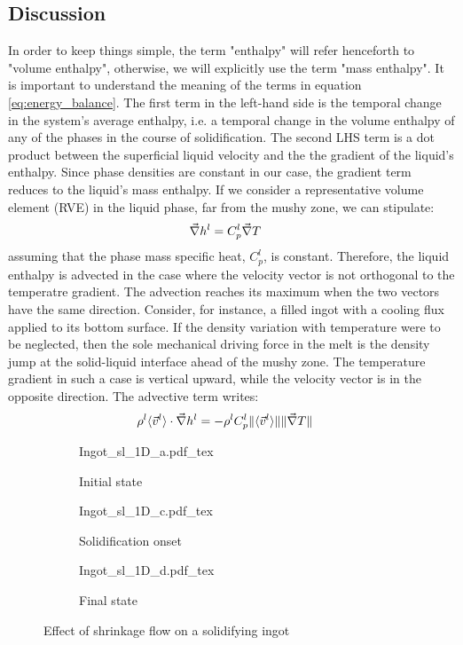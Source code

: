 \subsection{Discussion}
In order to keep things simple, the term "enthalpy" will refer henceforth to "volume enthalpy",
otherwise, we will explicitly use the term "mass enthalpy". It is important to understand the 
meaning of the terms in equation \eqref{eq:energy_balance}.
The first term in the left-hand side is the temporal change in the system's average enthalpy,
i.e. a temporal change in the volume enthalpy of any of the phases in the course of solidification.
The second LHS term is a dot product between the superficial liquid velocity and the the gradient
of the liquid's enthalpy. Since phase densities are constant in our case, the gradient term reduces
to the liquid's mass enthalpy. If we consider a representative volume element (RVE) in the liquid
phase, far from the mushy zone, we can stipulate:
\begin{align}
\label{eq:gradient_liquid_enthalpy}
& \vec{\nabla} h^l = C_p^l \vec{\nabla} T
\end{align}
assuming that the phase mass specific heat, $ C_p^l $, is constant. Therefore, the liquid enthalpy
is advected in the case where the velocity vector is not orthogonal to the temperatre gradient.
The advection reaches its maximum when the two vectors have the same direction. Consider, for instance,
a filled ingot with a cooling flux applied to its bottom surface. If the density variation with temperature
were to be neglected, then the sole mechanical driving force in the melt is the density jump at the solid-liquid
interface ahead of the mushy zone. The temperature gradient in such a case is vertical upward, while the velocity
vector is in the opposite direction. The advective term writes:
\begin{align}
& \rho^l \langle \vec{v}^l \rangle \cdot \vec{\nabla} h^l = - \rho^l C_p^l \lVert \langle \vec{v}^l \rangle \rVert \lVert \vec{\nabla} T \rVert
\end{align}
\begin{figure}
\centering
\begin{subfigure}[h!]{0.3\textwidth}\centering %
	\def\svgwidth{100pt}
	{Ingot_sl_1D_a.pdf_tex}
	\caption{Initial state}
	\label{fig:ingot_1d_a}
\end{subfigure}
\begin{subfigure}[h!]{0.3\textwidth}\centering %
	\centering
	\def\svgwidth{100pt}
	{Ingot_sl_1D_c.pdf_tex}
	\caption{Solidification onset}
	\label{fig:ingot_1d_c}
\end{subfigure}
\begin{subfigure}[h!]{0.3\textwidth}\centering %
	\centering
	\def\svgwidth{100pt}
	{Ingot_sl_1D_d.pdf_tex}
	\caption{Final state}
	\label{fig:ingot_1d_d}
\end{subfigure}
\caption{Effect of shrinkage flow on a solidifying ingot}
\end{figure}
